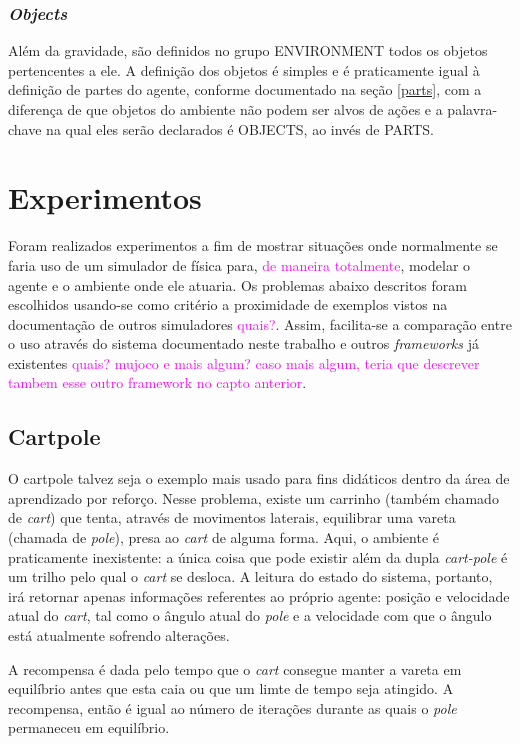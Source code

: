 \documentclass[cic,tc]{iiufrgs}
\newcommand\bruno[1]{\textcolor{magenta}{#1}}
\begin{document}
    \subsection{\textit{Objects}}
    Além da gravidade, são definidos no grupo ENVIRONMENT todos os objetos pertencentes a ele. A definição dos objetos é simples e é praticamente igual
    à definição de partes do agente, conforme documentado na seção \ref{parts}, com a diferença de que objetos do ambiente não podem ser alvos de
    ações e a palavra-chave na qual eles serão declarados é OBJECTS, ao invés de PARTS. 
    \chapter{Experimentos}
    Foram realizados experimentos a fim de mostrar situações onde normalmente se faria uso de um simulador de
    física para, \bruno{de maneira totalmente}, modelar o agente e o ambiente onde ele atuaria. Os problemas abaixo descritos foram escolhidos
    usando-se como critério a proximidade de exemplos vistos na documentação de outros simuladores \bruno{quais?}. Assim, facilita-se
    a comparação entre o uso através do sistema documentado neste trabalho e outros \textit{frameworks} já existentes \bruno{quais? mujoco e mais algum? caso mais algum, teria que descrever tambem esse outro framework no capto anterior}.
    
    \section{Cartpole}
    O cartpole talvez seja o exemplo mais usado para fins didáticos dentro da área de aprendizado por reforço. Nesse problema,
    existe um carrinho (também chamado de \textit{cart}) que tenta, através de movimentos laterais, equilibrar uma
    vareta (chamada de \textit{pole}), presa ao \textit{cart} de alguma forma. Aqui, o ambiente é praticamente inexistente:
    a única coisa que pode existir além da dupla \textit{cart-pole} é um trilho pelo qual o \textit{cart} se desloca.
    A leitura do estado do sistema, portanto, irá retornar apenas informações referentes ao próprio agente: posição e velocidade
    atual do \textit{cart}, tal como o ângulo atual do \textit{pole} e a velocidade com que o ângulo está atualmente sofrendo alterações. \par
    A recompensa é dada pelo tempo que o \textit{cart} consegue manter a vareta em equilíbrio antes que esta caia ou
    que um limte de tempo seja atingido. A recompensa, então é igual ao número de iterações durante as quais o \textit{pole}
    permaneceu em equilíbrio.
\end{document}
